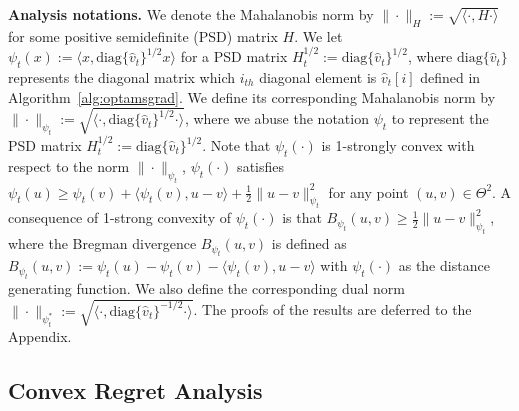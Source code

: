 \documentclass[wcp]{jmlr}
\begin{document}
\textbf{Analysis notations.}\hspace{0.1in}
We denote the Mahalanobis norm by $\|\cdot\|_H := \sqrt{ \langle \cdot, H \cdot \rangle }$ for some positive semidefinite (PSD) matrix $H$.
We let $\psi_t(x) := \langle x, \text{diag}\{\hat{v}_t\}^{1/2} x \rangle$ for a PSD matrix $H_t^{1/2}:= \text{diag}\{\hat{v}_t\}^{1/2}$, where $\text{diag}\{\hat{v}_t\}$ represents the diagonal matrix which $i_{th}$ diagonal element is $\hat{v}_t[i]$ defined in Algorithm~\ref{alg:optamsgrad}.
We define its corresponding Mahalanobis norm by $\| \cdot \|_{\psi_t}:=  \sqrt{ \langle \cdot, \text{diag}\{\hat{v}_t\}^{1/2} \cdot \rangle }$,
where we abuse the notation $\psi_t$ to represent the PSD matrix $H_t^{1/2}:=\text{diag}\{\hat{v}_t\}^{1/2}$.
Note that $\psi_t(\cdot)$ is 1-strongly convex with respect to the norm $\| \cdot \|_{\psi_t}$, \ie $\psi_t(\cdot)$ satisfies $\psi_t(u) \geq \psi_t(v) + \langle \psi_t(v), u - v \rangle + \frac{1}{2} \| u - v\|^2_{\psi_t}$ for any point $(u,v) \in \Theta^2$.
A consequence of 1-strong convexity of $\psi_t(\cdot)$ is that $B_{\psi_t}(u,v) \geq \frac{1}{2} \| u - v \|^2_{\psi_t}$, where the Bregman divergence $B_{\psi_t}(u,v)$ is defined as $B_{\psi_t}(u,v) := \psi_t(u) - \psi_t(v) - \langle \psi_t(v), u - v \rangle$ with $\psi_t(\cdot)$ as the distance generating function.
We also define the corresponding dual norm $\| \cdot \|_{\psi_t^*}:= \sqrt{ \langle \cdot, \text{diag}\{\hat{v}_t\}^{-1/2} \cdot \rangle }$.
The proofs of the results are deferred to the Appendix.


\vspace{-0.05in}
\subsection{Convex Regret Analysis}\label{sec:convex}
\vspace{-0.05in}
\end{document}
